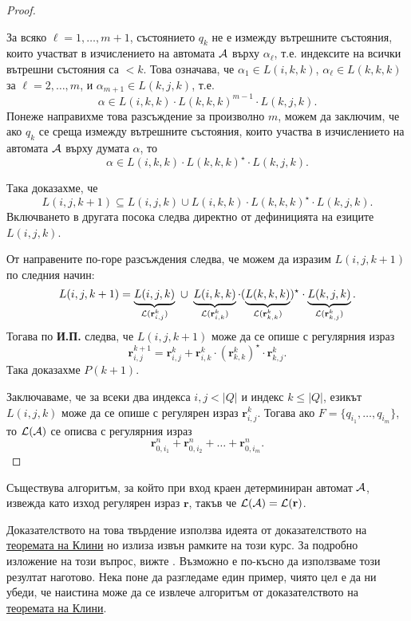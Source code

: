 \begin{proof}
\begin{enumerate}[a)]
\begin{itemize}
      За всяко $\ell=1,\dots,m+1$, състоянието $q_k$ не е измежду вътрешните състояния, които участват в изчислението на автомата $\mathcal{A}$ върху $\alpha_\ell$, т.е. индексите на всички вътрешни състояния са $<k$.
      Това означава, че $\alpha_1 \in L(i,k,k)$, $\alpha_\ell \in L(k,k,k)$ за $\ell=2,\dots,m$, и $\alpha_{m+1} \in L(k,j,k)$, т.е.
      \[\alpha \in L(i,k,k) \cdot L(k,k,k)^{m-1} \cdot L(k,j,k).\]
      Понеже направихме това разсъждение за произволно $m$,
      можем да заключим, че ако $q_k$ се среща измежду вътрешните състояния, които участва в изчислението на автомата $\mathcal{A}$ върху думата $\alpha$,
      то \[\alpha \in L(i,k,k) \cdot L(k,k,k)^\star \cdot L(k,j,k).\]
    \end{itemize}
    Така доказахме, че 
    \[L(i,j,k+1) \subseteq L(i,j,k) \cup L(i,k,k) \cdot L(k,k,k)^\star \cdot L(k,j,k).\]
    Включването в другата посока следва директно от дефиницията на езиците $L(i,j,k)$.
    
    От направените по-горе разсъждения следва, че можем да изразим $L(i,j,k+1)$ по следния начин:
    \[L(i,j,k+1) = \underbrace{L(i,j,k)}_{\L(\mathbf{r}^{k}_{i,j})}\ \cup\ \underbrace{L(i,k,k)}_{\L(\mathbf{r}^{k}_{i,k})}\cdot (\underbrace{L(k,k,k)}_{\L(\mathbf{r}^{k}_{k,k})})^\star \cdot \underbrace{L(k,j,k)}_{\L(\mathbf{r}^{k}_{k,j})}.\]
    Тогава по {\bf И.П.} следва, че $L(i,j,k+1)$ може да се опише с регулярния израз
    \begin{equation}
      \label{eq:kleene}
      \mathbf{r}^{k+1}_{i,j} = \mathbf{r}^{k}_{i,j} + \mathbf{r}^{k}_{i,k}\cdot (\mathbf{r}^{k}_{k,k})^\star\cdot \mathbf{r}^{k}_{k,j}.
    \end{equation}
    Така доказахме $P(k+1)$.
  \end{enumerate}
  Заключаваме, че за всеки два индекса $i,j < |Q|$ и индекс $k \leq |Q|$, езикът $L(i,j,k)$ може да се опише с регулярен израз $\mathbf{r}^{k}_{i,j}$.
  Тогава ако $F = \{q_{i_1},\dots,q_{i_m}\}$, то $\mathcal{L}(\mathcal{A})$ се описва с регулярния израз
  \[\mathbf{r}^n_{0,i_1} + \mathbf{r}^n_{0,i_2} + \dots + \mathbf{r}^n_{0,i_m}.\]
\end{proof}

\begin{proposition}
  Съществува алгоритъм, за който при вход краен детерминиран автомат $\mathcal{A}$,
  извежда като изход регулярен израз $\mathbf{r}$, такъв че $\mathcal{L}(\mathcal{A}) = \mathcal{L}(\mathbf{r})$.
\end{proposition}

Доказателството на това твърдение използва идеята от доказателството на \hyperref[th:regular:kleene]{теоремата на Клини}
но излиза извън рамките на този курс. За подробно изложение на този въпрос, вижте \cite[стр. 69]{sipser3}.
Възможно е по-късно да използваме този резултат наготово.
Нека поне да разгледаме един пример, чиято цел е да ни убеди, 
че наистина може да се извлече алгоритъм от доказателството на \hyperref[th:regular:kleene]{теоремата на Клини}.


